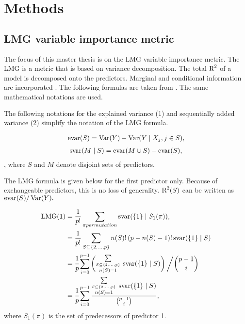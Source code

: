 \documentclass[11pt,a4paper,twoside]{book}
\begin{document}








\chapter{Methods} 

\section{LMG variable importance metric}

The focus of this master thesis is on the LMG variable importance metric. The LMG is a metric that is based on variance decomposition. The total $\text{R}^2$ of a model is decomposed onto the predictors. Marginal and conditional information are incorporated \citep{Gromping2015} .  The following formulas are taken from \cite{Gromping2015}. The same mathematical notations are used. 

The following  notations for the explained variance (1) and sequentially added variance (2) simplify the notation of the LMG formula. 

   \begin{align} 
     \text{evar}(S) = \operatorname{Var}(Y) - \operatorname{Var}( Y \mid X_{j}, j \in S),   \label{eq:1} 
   \end{align} 
   \begin{align} 
     \text{svar}(M \mid S) = \text{evar}(M \cup S) - \text{evar}(S), \label{eq:2} 
    \end{align} , where $S$ and $M$ denote disjoint sets of predictors.
    
   The LMG formula is given below for the first predictor only. Because of exchangeable predictors, this is no loss of generality.  $\text{R}^2(S)$ can be written as $\text{evar}(S)/\operatorname{Var}(Y).$ 

   \begin{align*} 
     \LMG(1) &= \frac{1}{p!} \sum_{\pi permutation}^{} \SVAR(\{1\} \mid S_{1}(\pi)),   \nonumber  \\
     &= \frac{1}{p!} \sum_{S \subseteq \{ 2, \dots, p \} }^{} n(S)! \, (p-n(S)-1)! \, \SVAR(\{1\} \mid S) \nonumber  \\
     &=  \cfrac{1}{p} \sum_{i=0}^{p-1} \left( \substack {\sum\limits_{ S \subseteq \{ 2, \dots, p \}}\\n(S)=1}^{} \ \SVAR(\{1\} \mid S)\right)\bigg/ \binom{p-1}{i}  \nonumber \\   
         &=  \cfrac{1}{p} \sum_{i=0}^{p-1} \frac{ \substack{\sum\limits_{ S \subseteq \{ 2, \dots, p \}}\\n(S)=1}^{} \ \SVAR(\{1\} \mid S)}{\binom{p-1}{i}}, \nonumber \\      
   \end{align*}
   where $S_{1}(\pi)$ is the set of predecessors of predictor 1.
   
\end{document}
